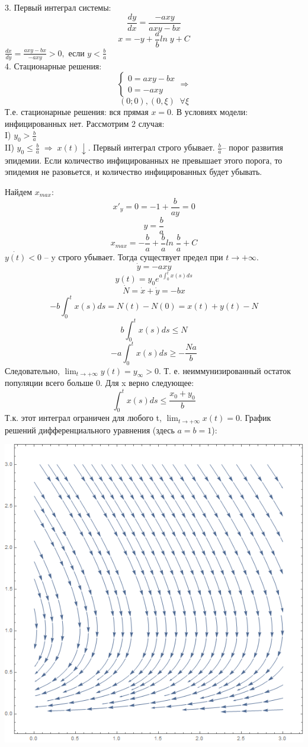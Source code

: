 \documentclass[10pt]{report}
\begin{document}
3. Первый интеграл системы:
\[\frac {dy} {dx} = \frac {-axy} {axy-bx}\]
\[x=-y+\frac a b ln \; y +C\]
$\frac {dx} {dy}  = \frac {axy-bx} {-axy}> 0,$ если $y< \frac b a $\\


4. Стационарные решения:
 \[ \left\{
\begin{array}{lr}
0=axy-bx\\
0=-axy
\end{array}
\right. \Rightarrow\]
\[(0;0), (0, \xi) \;\; \forall \xi\]
Т.е. стационарные решения: вся прямая $x=0$. В условиях модели: инфицированных нет. Рассмотрим 2 случая:\\
I) $y_0> \frac b a$\\
II) $y_0 \leq \frac b a \; \Rightarrow \; x(t) \downarrow$.  Первый интеграл строго убывает. 
$\frac b a$-- порог развития эпидемии. Если количество инфицированных не превышает этого порога, то эпидемия не разовьется, и количество инфицированных будет убывать.

Найдем $x_{max}$:
\[x'_y=0=-1+ \frac {b} {ay}=0 \]
\[y= \frac b a \]
\[x_{max}=- \frac b a +\frac b aln\;\frac b a +C\]
$\dot{y(t)}<0$ -- y строго убывает. Тогда существует предел при $t\rightarrow+\infty$. 
\[\dot{y}=-axy\]
\[y(t)=y_0e^{a\int^t_0x(s)ds}\] 
\[\dot{N}=\dot{x}+\dot{y}=-bx\]
\[-b\int^t_0x(s)ds=N(t)-N(0)=x(t)+y(t)-N\]
\[b\int^t_0x(s)ds \leq N\]
\[-a\int^t_0x(s)ds \geq -\frac {Na} {b}\]
Следовательно, $\lim_{t\to+\infty} y(t)=y_{\infty}>0$. Т. е. неиммунизированный остаток популяции всего больше 0.
Для x верно следующее:
\[\int^t_0x(s)ds\leq \frac {x_0+y_0} {b}\]
Т.к. этот интеграл ограничен для любого t,  $\lim_{t\to+\infty} x(t)=0.$
График решений дифференциального уравнения (здесь $ a=b=1$):
\begin{center}
{\includegraphics[scale=0.48]{graph13.2.png}} 
\end{center}
\end{document}
